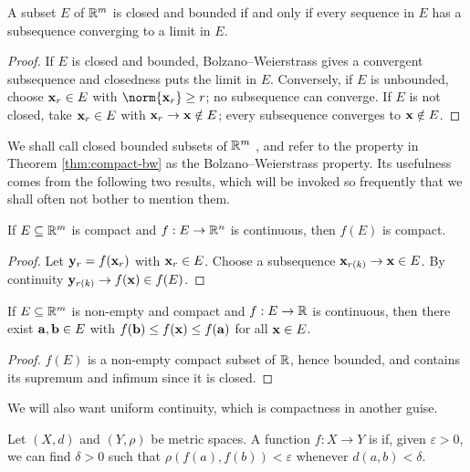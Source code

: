 \documentclass[a4paper]{scrartcl}
\begin{document}
\begin{theorem}\label{thm:compact-bw}
	A subset $E$ of $\mathbb{R}^m$ is closed and bounded if and only if every sequence in $E$ has a subsequence converging to a limit in $E$.
\end{theorem}

\begin{proof}
	If $E$ is closed and bounded, Bolzano--Weierstrass gives a convergent subsequence and closedness puts the limit in $E$. Conversely, if $E$ is unbounded, choose $\mathbf{x}_r \in E$ with $\norm{\vv{x}_r} \geq r$; no subsequence can converge. If $E$ is not closed, take $\mathbf{x}_r \in E$ with $\mathbf{x}_r \to \mathbf{x} \notin E$; every subsequence converges to $\mathbf{x} \notin E$.
\end{proof}

We shall call closed bounded subsets of $\mathbb{R}^m$ , and refer to the property in Theorem \ref{thm:compact-bw} as the Bolzano--Weierstrass property. Its usefulness comes from the following two results, which will be invoked so frequently that we shall often not bother to mention them.

\begin{theorem}
	If $E \subseteq \mathbb{R}^m$ is compact and $f : E \to \mathbb{R}^n$ is continuous, then $f(E)$ is compact.
\end{theorem}

\begin{proof}
	Let $\mathbf{y}_r = f(\mathbf{x}_r)$ with $\mathbf{x}_r \in E$. Choose a subsequence $\mathbf{x}_{r(k)} \to \mathbf{x} \in E$. By continuity $\mathbf{y}_{r(k)} \to f(\mathbf{x}) \in f(E)$.
\end{proof}

\begin{theorem}\label{thm:attains-bounds}
	If $E \subseteq \mathbb{R}^m$ is non-empty and compact and $f : E \to \mathbb{R}$ is continuous, then there exist $\mathbf{a}, \mathbf{b} \in E$ with $f(\mathbf{b}) \leq f(\mathbf{x}) \leq f(\mathbf{a})$ for all $\mathbf{x} \in E$.
\end{theorem}

\begin{proof}
	$f(E)$ is a non-empty compact subset of $\mathbb{R}$, hence bounded, and contains its supremum and infimum since it is closed.
\end{proof}

We will also want uniform continuity, which is compactness in another guise.

\begin{definition}
	Let $(X,d)$ and $(Y,\rho)$ be metric spaces. A function $f : X \to Y$ is  if, given $\varepsilon>0$, we can find $\delta>0$ such that $\rho(f(a),f(b)) < \varepsilon$ whenever $d(a,b) < \delta$.
\end{definition}
\end{document}
